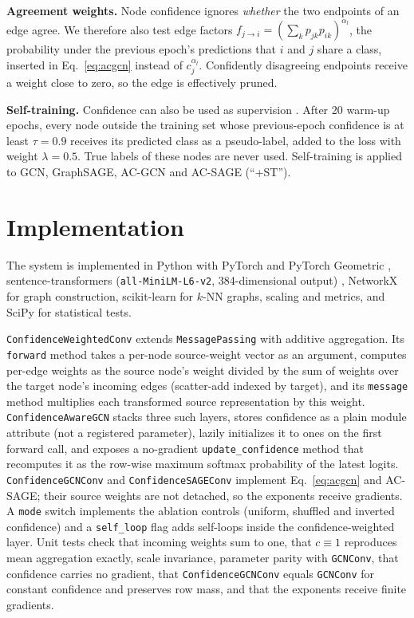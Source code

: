 \documentclass[conference]{IEEEtran}
\begin{document}
\textbf{Agreement weights.} Node confidence ignores \emph{whether} the two endpoints of an edge agree. We therefore also test edge factors $f_{j\rightarrow i}=(\sum_k p_{jk}p_{ik})^{\alpha_l}$, the probability under the previous epoch's predictions that $i$ and $j$ share a class, inserted in Eq.~\eqref{eq:acgcn} instead of $c_j^{\alpha_l}$. Confidently disagreeing endpoints receive a weight close to zero, so the edge is effectively pruned.

\textbf{Self-training.} Confidence can also be used as supervision \cite{lee2013pseudo,li2018deeper}. After 20 warm-up epochs, every node outside the training set whose previous-epoch confidence is at least $\tau=0.9$ receives its predicted class as a pseudo-label, added to the loss with weight $\lambda=0.5$. True labels of these nodes are never used. Self-training is applied to GCN, GraphSAGE, AC-GCN and AC-SAGE (``+ST'').

\section{Implementation}

The system is implemented in Python with PyTorch and PyTorch Geometric \cite{fey2019pyg}, sentence-transformers (\texttt{all-MiniLM-L6-v2}, 384-dimensional output) \cite{reimers2019sbert}, NetworkX for graph construction, scikit-learn for $k$-NN graphs, scaling and metrics, and SciPy for statistical tests.

\texttt{ConfidenceWeightedConv} extends \texttt{MessagePassing} with additive aggregation. Its \texttt{forward} method takes a per-node source-weight vector as an argument, computes per-edge weights as the source node's weight divided by the sum of weights over the target node's incoming edges (scatter-add indexed by target), and its \texttt{message} method multiplies each transformed source representation by this weight. \texttt{ConfidenceAwareGCN} stacks three such layers, stores confidence as a plain module attribute (not a registered parameter), lazily initializes it to ones on the first forward call, and exposes a no-gradient \texttt{update\_confidence} method that recomputes it as the row-wise maximum softmax probability of the latest logits. \texttt{ConfidenceGCNConv} and \texttt{ConfidenceSAGEConv} implement Eq.~\eqref{eq:acgcn} and AC-SAGE; their source weights are not detached, so the exponents receive gradients. A \texttt{mode} switch implements the ablation controls (uniform, shuffled and inverted confidence) and a \texttt{self\_loop} flag adds self-loops inside the confidence-weighted layer. Unit tests check that incoming weights sum to one, that $c\equiv1$ reproduces mean aggregation exactly, scale invariance, parameter parity with \texttt{GCNConv}, that confidence carries no gradient, that \texttt{ConfidenceGCNConv} equals \texttt{GCNConv} for constant confidence and preserves row mass, and that the exponents receive finite gradients.
\end{document}
